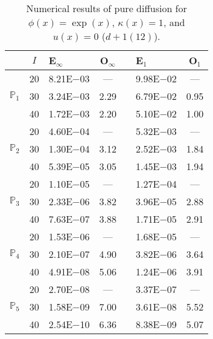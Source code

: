 \begin{table}[H]
\centering
\caption{Numerical results of pure diffusion for $\phi(x)=\exp(x)$, $\kappa(x)=1$, and $u(x)=0$ ($d+1 (12)$).}
\begin{tabular}{@{}l c l c c l c@{}}
\toprule
 & $I$ & E$_{\infty}$ & O$_{\infty}$ && E$_1$ & O$_1$\\
\midrule
\multirow{3}{*}{$\mathbb{P}_{1}$}
 & 20 & 8.21E$-$03 & --- && 9.98E$-$02 & ---\\
 & 30 & 3.24E$-$03 & 2.29 && 6.79E$-$02 & 0.95\\
 & 40 & 1.72E$-$03 & 2.20 && 5.10E$-$02 & 1.00\\
\midrule
\multirow{3}{*}{$\mathbb{P}_{2}$}
 & 20 & 4.60E$-$04 & --- && 5.32E$-$03 & ---\\
 & 30 & 1.30E$-$04 & 3.12 && 2.52E$-$03 & 1.84\\
 & 40 & 5.39E$-$05 & 3.05 && 1.45E$-$03 & 1.94\\
\midrule
\multirow{3}{*}{$\mathbb{P}_{3}$}
 & 20 & 1.10E$-$05 & --- && 1.27E$-$04 & ---\\
 & 30 & 2.33E$-$06 & 3.82 && 3.96E$-$05 & 2.88\\
 & 40 & 7.63E$-$07 & 3.88 && 1.71E$-$05 & 2.91\\
\midrule
\multirow{3}{*}{$\mathbb{P}_{4}$}
 & 20 & 1.53E$-$06 & --- && 1.68E$-$05 & ---\\
 & 30 & 2.10E$-$07 & 4.90 && 3.82E$-$06 & 3.64\\
 & 40 & 4.91E$-$08 & 5.06 && 1.24E$-$06 & 3.91\\
\midrule
\multirow{3}{*}{$\mathbb{P}_{5}$}
 & 20 & 2.70E$-$08 & --- && 3.37E$-$07 & ---\\
 & 30 & 1.58E$-$09 & 7.00 && 3.61E$-$08 & 5.52\\
 & 40 & 2.54E$-$10 & 6.36 && 8.38E$-$09 & 5.07\\
\bottomrule
\end{tabular}
\end{table}